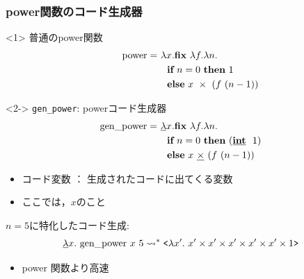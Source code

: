 \begin{frame}
  \frametitle{power関数のコード生成器}
  \begin{onlyenv}<1>
    普通のpower関数
    \begin{align*}
      \text{~~~~~~power} =~ &\lambda x. \textbf{fix}~ \lambda f. \lambda n. \\
                            &~~\textbf{if}~ n=0~ \textbf{then}~  1 \\
                            &~~\textbf{else}~ x~ \times~ (f~ (n - 1))
    \end{align*}
  \end{onlyenv}

  \begin{onlyenv}<2->
    \texttt{gen\_power}: powerコード生成器
    \begin{align*}
      \text{gen\_power} =~ &\underline{\lambda} x. \textbf{fix}~ \lambda f. \lambda n. \\
                           &~~\textbf{if}~ n=0~ \textbf{then}~ (\underline{\textbf{int}}~~ 1) \\
                           &~~\textbf{else}~ x~ \underline{\textbf{$\times$}}~ (f~ (n - 1))
    \end{align*}
  \end{onlyenv}
  \pause
  \pause

  \begin{itemize}
  \item コード変数 ： 生成されたコードに出てくる変数
  \item ここでは，$x$のこと
  \end{itemize}

  \pause
  $n = 5$に特化したコード生成:
  \pause
  \begin{align*}
    \underline{\lambda}{x}.{~\text{gen\_power}~ x~ 5} \leadsto^* \texttt{<}{\lambda{x'}.{~x'
    \times x' \times x' \times x' \times x' \times 1}}\texttt{>}
  \end{align*}

  \center
  \begin{itemize}
  \item power 関数より高速
  \end{itemize}

\end{frame}


